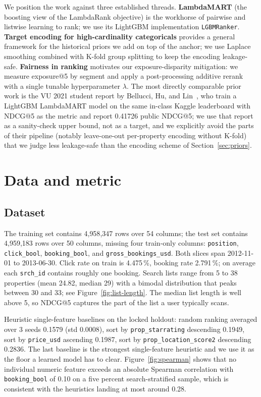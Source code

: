 \documentclass[runningheads]{llncs}
\begin{document}
\noindent We position the work against three established threads.
\textbf{LambdaMART} (the boosting view of the LambdaRank objective)
is the workhorse of pairwise and listwise learning to rank; we use
its LightGBM implementation \texttt{LGBMRanker}. \textbf{Target
encoding for high-cardinality categoricals} provides a general
framework for the historical priors we add on top of the anchor; we
use Laplace smoothing combined with K-fold group splitting to keep
the encoding leakage-safe. \textbf{Fairness in ranking} motivates
our exposure-disparity mitigation: we measure exposure@5 by segment
and apply a post-processing additive rerank with a single tunable
hyperparameter $\lambda$. The most directly comparable prior work
is the VU 2021 student report by Bellucci, Hu, and
Lin~\cite{bellucci2021expedia}, who train a LightGBM LambdaMART
model on the same in-class Kaggle leaderboard with NDCG@5 as the
metric and report 0.41726 public NDCG@5; we use that report as a
sanity-check upper bound, not as a target, and we explicitly avoid
the parts of their pipeline (notably leave-one-out per-property
encoding without K-fold) that we judge less leakage-safe than the
encoding scheme of Section~\ref{sec:priors}.

\section{Data and metric}
\label{sec:data}

\subsection{Dataset}

The training set contains 4{,}958{,}347 rows over 54 columns; the
test set contains 4{,}959{,}183 rows over 50 columns, missing four
train-only columns: \texttt{position}, \texttt{click\_bool},
\texttt{booking\_bool}, and \texttt{gross\_bookings\_usd}. Both
slices span 2012-11-01 to 2013-06-30. Click rate on train is
4.475\,\%, booking rate 2.791\,\%; on average each \texttt{srch\_id}
contains roughly one booking. Search lists range from 5 to 38
properties (mean 24.82, median 29) with a bimodal distribution
that peaks between 30 and 33; see Figure~\ref{fig:list-length}. The
median list length is well above 5, so NDCG@5 captures the part of
the list a user typically scans.

Heuristic single-feature baselines on the locked holdout: random
ranking averaged over 3 seeds 0.1579 (std 0.0008), sort by
\texttt{prop\_starrating} descending 0.1949, sort by
\texttt{price\_usd} ascending 0.1987, sort by
\texttt{prop\_location\_score2} descending 0.2836. The last
baseline is the strongest single-feature heuristic and we use it as
the floor a learned model has to clear. Figure~\ref{fig:spearman} shows
that no individual numeric feature exceeds an absolute Spearman
correlation with \texttt{booking\_bool} of 0.10 on a five percent
search-stratified sample, which is consistent with the heuristics
landing at most around 0.28.
\end{document}
